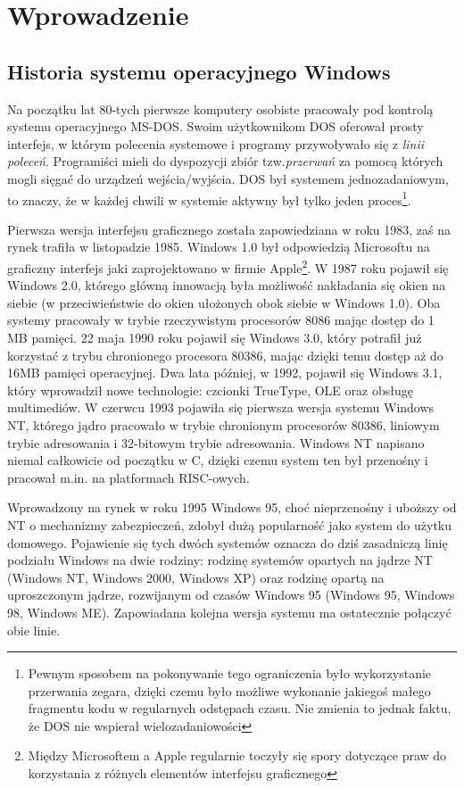 ﻿%

\chapter{Wprowadzenie}

\section{Historia systemu operacyjnego Windows}

Na początku lat 80-tych pierwsze komputery osobiste pracowały pod kontrolą systemu operacyjnego
MS-DOS. Swoim użytkownikom DOS oferował prosty interfejs, w którym polecenia systemowe i programy
przywoływało się z {\em linii poleceń}. Programiści mieli do dyspozycji zbiór tzw.{\em przerwań}
za pomocą których mogli sięgać do urządzeń wejścia/wyjścia. DOS był systemem jednozadaniowym,
to znaczy, że w każdej chwili w systemie aktywny był tylko jeden proces\footnote{Pewnym
sposobem na pokonywanie tego ograniczenia było wykorzystanie przerwania zegara, dzięki czemu
było możliwe wykonanie jakiegoś małego fragmentu kodu w regularnych odstępach czasu. Nie zmienia
to jednak faktu, że DOS nie wspierał wielozadaniowości}. 

Pierwsza wersja interfejsu graficznego została zapowiedziana w roku 1983, zaś na rynek trafiła
w listopadzie 1985. Windows 1.0 był odpowiedzią Microsoftu na graficzny interfejs jaki zaprojektowano
w firmie Apple\footnote{Między Microsoftem a Apple regularnie toczyły się spory dotyczące praw
do korzystania z różnych elementów interfejsu graficznego}. W 1987 roku pojawił się Windows 2.0, którego
główną innowacją była możliwość nakładania się okien na siebie (w przeciwieństwie do okien ułożonych obok siebie
w Windows 1.0). Oba systemy pracowały w trybie rzeczywistym procesorów 8086 mając dostęp do 1 MB pamięci.
22 maja 1990 roku pojawił się Windows 3.0, który potrafił już korzystać z trybu chronionego procesora
80386, mając dzięki temu dostęp aż do 16MB pamięci operacyjnej. Dwa lata później, w 1992, pojawił się
Windows 3.1, który wprowadził nowe technologie: czcionki TrueType, OLE oraz obsługę multimediów.
W czerwcu 1993 pojawiła się pierwsza wersja systemu Windows NT, którego jądro pracowało w trybie chronionym
procesorów 80386, liniowym trybie adresowania i 32-bitowym trybie adresowania. Windows NT napisano niemal 
całkowicie od początku w C, dzięki czemu system ten był przenośny i pracował m.in. na platformach RISC-owych.

Wprowadzony na rynek w roku 1995 Windows 95, choć nieprzenośny i uboższy od NT o mechanizmy zabezpieczeń,
zdobył dużą popularność jako system do użytku domowego. Pojawienie się tych dwóch systemów oznacza do dziś
zasadniczą linię podziału Windows na dwie rodziny: rodzinę systemów opartych na jądrze NT (Windows NT, 
Windows 2000, Windows XP) oraz rodzinę opartą na uproszczonym jądrze, rozwijanym od czasów Windows 95
(Windows 95, Windows 98, Windows ME). Zapowiadana kolejna wersja systemu ma ostatecznie połączyć
obie linie.

